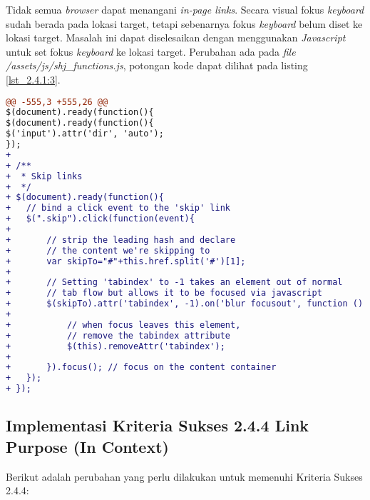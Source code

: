 Tidak semua \textit{browser} dapat menangani \textit{in-page links}. Secara visual fokus \textit{keyboard} sudah berada pada lokasi target, tetapi sebenarnya fokus \textit{keyboard} belum diset ke lokasi target. Masalah ini dapat diselesaikan dengan menggunakan \textit{Javascript} untuk set fokus \textit{keyboard} ke lokasi target. Perubahan ada pada \textit{file} \textit{/assets/js/shj\_functions.js}, potongan kode dapat dilihat pada listing \ref{lst_2.4.1:3}.

\begin{lstlisting}[language=diff, caption=Perubahan pada \textit{file} \textit{shj\_functions.js}, label=lst_2.4.1:3, basicstyle=\ttfamily, frame=single,
columns=fullflexible, keepspaces=true, breaklines=true]
@@ -555,3 +555,26 @@ 
$(document).ready(function(){
$(document).ready(function(){
$('input').attr('dir', 'auto');
});
+ 
+ /**
+  * Skip links
+  */
+ $(document).ready(function(){
+ 	// bind a click event to the 'skip' link
+ 	$(".skip").click(function(event){
+     
+ 		// strip the leading hash and declare
+ 		// the content we're skipping to
+ 		var skipTo="#"+this.href.split('#')[1];
+ 
+ 		// Setting 'tabindex' to -1 takes an element out of normal 
+ 		// tab flow but allows it to be focused via javascript
+ 		$(skipTo).attr('tabindex', -1).on('blur focusout', function () {
+ 
+ 			// when focus leaves this element, 
+ 			// remove the tabindex attribute
+ 			$(this).removeAttr('tabindex');
+ 
+ 		}).focus(); // focus on the content container
+ 	});
+ });
\end{lstlisting}

\subsection{Implementasi Kriteria Sukses 2.4.4 Link Purpose (In Context)}
\label{subsec:implementasi_A_2.4.4}

Berikut adalah perubahan yang perlu dilakukan untuk memenuhi Kriteria Sukses 2.4.4:

